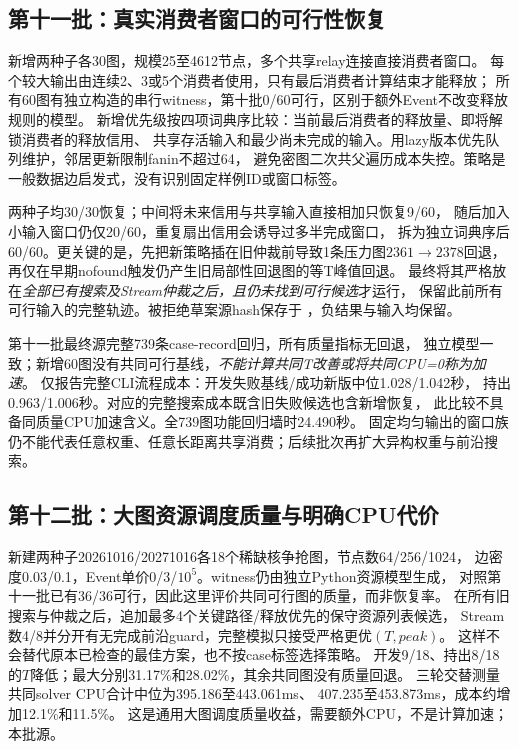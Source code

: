 \documentclass[UTF8,a4paper,11pt,fontset=fandol]{ctexart}
\begin{document}
\subsection{第十一批：真实消费者窗口的可行性恢复}
新增两种子各30图，规模25至4612节点，多个共享relay连接直接消费者窗口。
每个较大输出由连续2、3或5个消费者使用，只有最后消费者计算结束才能释放；
所有60图有独立构造的串行witness，第十批0/60可行，区别于额外Event不改变释放规则的模型。
新增优先级按四项词典序比较：当前最后消费者的释放量、即将解锁消费者的释放信用、
共享存活输入和最少尚未完成的输入。用lazy版本优先队列维护，邻居更新限制fanin不超过64，
避免密图二次共父遍历成本失控。策略是一般数据边启发式，没有识别固定样例ID或窗口标签。

两种子均30/30恢复；中间将未来信用与共享输入直接相加只恢复9/60，
随后加入小输入窗口仍仅20/60，重复扇出信用会诱导过多半完成窗口，
拆为独立词典序后60/60。更关键的是，先把新策略插在旧仲裁前导致1条压力图$2361\to2378$回退，
再仅在早期nofound触发仍产生旧局部性回退图的等T峰值回退。
最终将其严格放在\emph{全部已有搜索及Stream仲裁之后，且仍未找到可行候选}才运行，
保留此前所有可行输入的完整轨迹。被拒绝草案源hash保存于
，负结果与输入均保留。

第十一批最终源完整739条case-record回归，所有质量指标无回退，
独立模型一致；新增60图没有共同可行基线，\emph{不能计算共同T改善或将共同CPU=0称为加速}。
仅报告完整CLI流程成本：开发失败基线/成功新版中位1.028/\allowbreak{}1.042秒，
持出0.963/\allowbreak{}1.006秒。对应的完整搜索成本既含旧失败候选也含新增恢复，
此比较不具备同质量CPU加速含义。全739图功能回归墙时24.490秒。
固定均匀输出的窗口族仍不能代表任意权重、任意长距离共享消费；后续批次再扩大异构权重与前沿搜索。

\subsection{第十二批：大图资源调度质量与明确CPU代价}
新建两种子20261016/20271016各18个稀缺核争抢图，节点数64/256/1024，
边密度0.03/\allowbreak{}0.1，Event单价0/3/$10^5$。witness仍由独立Python资源模型生成，
对照第十一批已有36/36可行，因此这里评价共同可行图的质量，而非恢复率。
在所有旧搜索与仲裁之后，追加最多4个关键路径/释放优先的保守资源列表候选，
Stream数4/8并分开有无完成前沿guard，完整模拟只接受严格更优$(T,peak)$。
这样不会替代原本已检查的最佳方案，也不按case标签选择策略。
开发9/18、持出8/18的$T$降低；最大分别31.17\%和28.02\%，其余共同图没有质量回退。
三轮交替测量共同solver CPU合计中位为395.186至443.061ms、
407.235至453.873ms，成本约增加12.1\%和11.5\%。
这是通用大图调度质量收益，需要额外CPU，不是计算加速；本批源。
\end{document}
